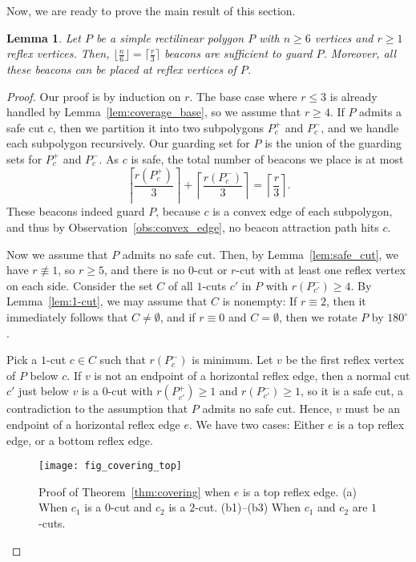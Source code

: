 \documentclass[11pt]{article}
\newtheorem{lemma}{Lemma}
\theoremstyle{definition}
\let\geq\geqslant
\let\leq\leqslant
\begin{document}
Now, we are ready to prove the main result of this section.
\begin{lemma} \label{lem:covering}
 Let $P$ be a simple rectilinear polygon $P$ with $n \geq 6$ vertices and
 $r \geq 1$ reflex vertices.
 Then, $\lfloor \frac{n}{6}\rfloor = \lceil \frac{r}{3} \rceil$ beacons are sufficient
 to guard $P$.  Moreover, all these beacons can be placed at reflex vertices of $P$.
\end{lemma}
\begin{proof}
Our proof is by induction on $r$.
The base case where $r \leq 3$ is already handled by Lemma~\ref{lem:coverage_base},
so  we assume that $r \geq 4$.
If $P$ admits a safe cut $c$, then we partition it into two subpolygons $P^+_c$ and $P^-_c$,
and  we handle each subpolygon recursively. 
Our guarding set for $P$ is the union of the guarding sets
for $P^+_c$ and $P^-_c$. As $c$ is safe, the total number of beacons we place is at most
 \[ \left\lceil \frac{r(P^+_c)}{3} \right\rceil + \left\lceil \frac{r(P^-_c)}{3} \right\rceil
    = \left\lceil \frac{r}{3} \right\rceil.\]
These beacons indeed guard $P$, because
$c$ is a convex edge of each subpolygon,
and thus by Observation~\ref{obs:convex_edge}, no beacon attraction path hits $c$.

Now we assume that $P$ admits no safe cut.
Then, by Lemma~\ref{lem:safe_cut}, we have $r \not\equiv 1$, so $r \geq 5$,
and there is no $0$-cut or $r$-cut with at least one reflex vertex on each side.
Consider the set $C$ of all $1$-cuts $c'$ in $P$ with $r(P^-_{c'}) \geq 4$.
By Lemma~\ref{lem:1-cut}, we may assume that $C$ is nonempty:
If $r \equiv 2$, then it immediately follows that $C \neq \emptyset$, 
and  if $r \equiv 0$ and $C = \emptyset$,
then we rotate $P$ by $180^\circ$.

Pick a $1$-cut $c \in C$ such that $r(P^-_c)$ is minimum.
Let $v$ be the first reflex vertex of $P$ below $c$.
If $v$ is not an endpoint of a horizontal reflex edge, then a normal cut $c'$ just below $v$
is a $0$-cut with $r(P^+_{c'}) \geq 1$ and $r(P^-_{c'}) \geq 1$,
so it is a safe cut, a contradiction to the assumption that $P$ admits no safe cut.
Hence, $v$ must be an endpoint of a horizontal reflex edge $e$.
We have two cases: Either $e$ is a top reflex edge, or a bottom reflex edge.

\begin{figure}[tb]
\centering
\texttt{[image: fig\_covering\_top]}
\caption{Proof of Theorem~\ref{thm:covering} when $e$ is a top reflex edge.
(a) When $c_1$ is a $0$-cut and $c_2$ is a $2$-cut.
(b1)--(b3) When $c_1$ and $c_2$ are $1$-cuts.}
\label{fig:covering_top}
\end{figure}



\end{proof}
\end{document}
